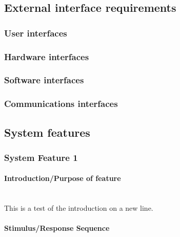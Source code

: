 \documentclass[compsoc,draftclsnofoot,onecolumn,10pt]{IEEEtran}
\begin{document}
\subsection{External interface requirements}

	\subsubsection{User interfaces}
	\subsubsection{Hardware interfaces}
	\subsubsection{Software interfaces}
	\subsubsection{Communications interfaces}

\subsection{System features}

\subsubsection{System Feature 1}

\paragraph{Introduction/Purpose of feature}~\\
This is a test of the introduction on a new line.

\paragraph{Stimulus/Response Sequence} 
\end{document}
